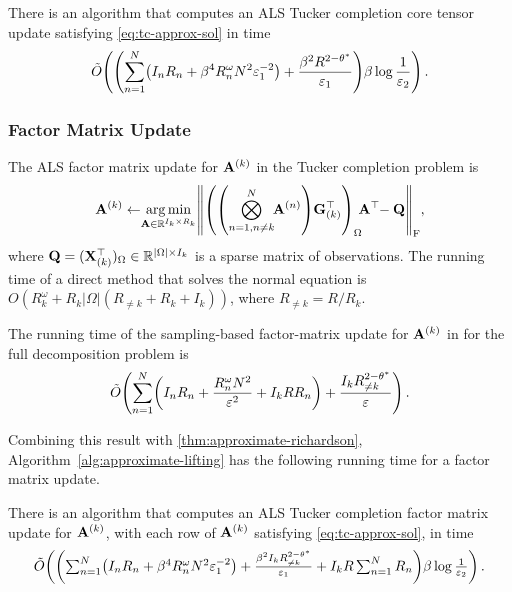 \begin{corollary}
\label{cor:fast_tucker_completion_core_tensor_update}
There is an algorithm that computes an ALS Tucker completion core tensor update satisfying \eqref{eq:tc-approx-sol}
in time
\begin{equation}
\label{eqn:fast_tucker_completion_core_tensor_update}
    \tilde{O}\parens*{\parens*{
         \sum_{n=1}^N \parens*{I_nR_n  + \beta^4 R_n^\omega N^2 \varepsilon_1^{-2}}
         +
         \frac{\beta^2 R^{2-\theta^*}}{\varepsilon_1}} \beta\log\frac{1}{\varepsilon_2}
    }\,.
\end{equation}
\end{corollary}

\subsubsection{Factor Matrix Update}
The ALS factor matrix update for $\mathbf{A}^{(k)}$ in the Tucker completion problem is
\[
    \mat{A}^{(k)}
    \leftarrow
    \hspace{-0.1cm}
    \argmin_{\mat{A}\in \R^{I_k \times R_k}} \norm*{ \parens*{
        \parens*{\bigotimes_{n=1,n\neq k}^N \hspace{-0.10cm} \mat{A}^{(n)} } \mat{G}_{(k)}^\top }_\Omega  \hspace{-0.10cm} \mat{A}^\top \hspace{-0.10cm} - \mat Q}_\frobenius,
\]
where $\mathbf{Q}= (\mathbf{X}^\top_{(k)})_\Omega \in \mathbb{R}^{|\Omega| \times I_k}$ is a sparse matrix of observations.
The running time of a direct method that solves the normal equation is
$O(R_k^\omega + R_k |\Omega| (R_{\neq k} + R_k + I_k))$, where $R_{\neq k} = R/R_k$.

The running time of the sampling-based factor-matrix update for $\mathbf{A}^{(k)}$ in \citet[Theorem 1.2]{fahrbach2022subquadratic}
for the full decomposition problem is
\[
    \tilde{O}\parens*{
        \sum_{n=1}^N \parens*{I_nR_n + \frac{R_n^\omega N^2}{\varepsilon^2} + I_k R R_n} + \frac{I_k R_{\neq k}^{2-\theta^*}}{\varepsilon}
    }\,.
\]

\noindent
Combining this result with \cref{thm:approximate-richardson},
Algorithm~\ref{alg:approximate-lifting} has the following running time for a factor matrix update.

\begin{corollary}
There is an algorithm that computes an ALS Tucker completion factor matrix update for $\mathbf{A}^{(k)}$,
with each row of $\mathbf{A}^{(k)}$ satisfying \eqref{eq:tc-approx-sol},
in time
\[
\textstyle
    \tilde{O} \parens*{
        \parens*{
            \sum_{n=1}^N \parens*{I_nR_n  + \beta^4 R_n^\omega N^2 \epsilon_1^{-2}}
            +
            \frac{\beta^2 I_k R_{\neq k}^{2-\theta^*}}{\epsilon_1} + I_k R\sum_{n=1}^N R_n } \beta \log \frac{1}{\epsilon_2}
    }\,.
\]
\end{corollary}

